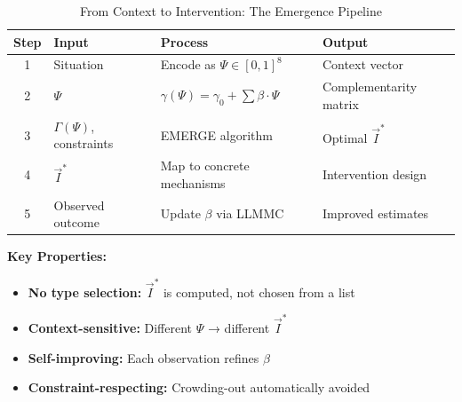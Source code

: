 \begin{table}[htbp]
\centering
\caption{From Context to Intervention: The Emergence Pipeline}
\label{tab:pipeline}
\renewcommand{\arraystretch}{1.4}
\begin{tabular}{@{}clll@{}}
\toprule
\textbf{Step} & \textbf{Input} & \textbf{Process} & \textbf{Output} \\
\midrule
1 & Situation & Encode as $\Psi \in [0,1]^8$ & Context vector \\
2 & $\Psi$ & $\gamma(\Psi) = \gamma_0 + \sum \beta \cdot \Psi$ & Complementarity matrix \\
3 & $\Gamma(\Psi)$, constraints & EMERGE algorithm & Optimal $\vec{I}^*$ \\
4 & $\vec{I}^*$ & Map to concrete mechanisms & Intervention design \\
5 & Observed outcome & Update $\beta$ via LLMMC & Improved estimates \\
\bottomrule
\end{tabular}
\end{table}

\textbf{Key Properties:}
\begin{itemize}[nosep]
    \item \textbf{No type selection:} $\vec{I}^*$ is computed, not chosen from a list
    \item \textbf{Context-sensitive:} Different $\Psi$ → different $\vec{I}^*$
    \item \textbf{Self-improving:} Each observation refines $\beta$
    \item \textbf{Constraint-respecting:} Crowding-out automatically avoided
\end{itemize}

